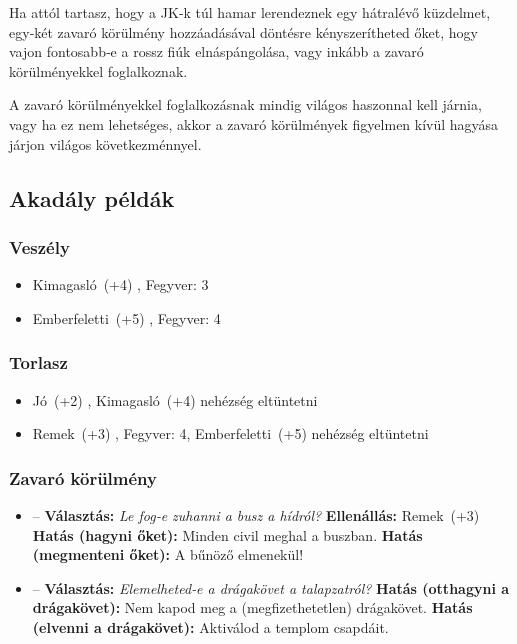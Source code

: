 Ha attól tartasz, hogy a JK‑k túl hamar lerendeznek egy hátralévő küzdelmet, egy‑két zavaró körülmény hozzáadásával döntésre kényszerítheted őket, hogy vajon fontosabb‑e a rossz fiúk elnáspángolása, vagy inkább a zavaró körülményekkel foglalkoznak.

A zavaró körülményekkel foglalkozásnak mindig világos haszonnal kell járnia, vagy ha ez nem lehetséges, akkor a zavaró körülmények figyelmen kívül hagyása járjon világos következménnyel.

\subsection{Akadály példák}

\subsubsection{Veszély}

\begin{itemize}
    \item Kimagasló~(+4) , Fegyver: 3
    \item Emberfeletti~(+5) , Fegyver: 4
\end{itemize}

\subsubsection{Torlasz}

\begin{itemize}
    \item Jó~(+2) , Kimagasló~(+4) nehézség eltüntetni
    \item Remek~(+3) , Fegyver: 4, Emberfeletti~(+5) nehézség eltüntetni
\end{itemize}

\subsubsection{Zavaró körülmény}

\begin{itemize}
    \item {} – \textbf{Választás:} \textit{Le fog‑e zuhanni a busz a hídról?}
    \newline
    \textbf{Ellenállás:} Remek~(+3)
    \newline
    \textbf{Hatás (hagyni őket):} Minden civil meghal a buszban.
    \newline
    \textbf{Hatás (megmenteni őket):} A bűnöző elmenekül!
\end{itemize}

\begin{itemize}
    \item {} – \textbf{Választás:} \textit{Elemelheted‑e a drágakövet a talapzatról?}
    \newline
    \textbf{Hatás (otthagyni a drágakövet):} Nem kapod meg a (megfizethetetlen) drágakövet.
    \newline
    \textbf{Hatás (elvenni a drágakövet):} Aktiválod a templom csapdáit.
\end{itemize}
